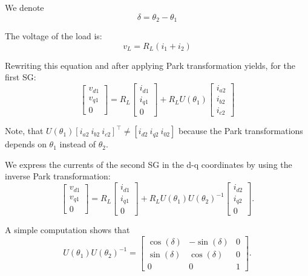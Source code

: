 \documentclass[conference]{IEEEtran}
\newcommand{\BE}{\begin{equation}}
\newcommand{\BEQ}[1]{\BE\label{#1}} %
\begin{document}
We denote 
$$\delta=\theta_{2}-\theta_{1}$$

The voltage of the load is:
$$v_L=R_{L}(i_{1}+i_{2})$$

Rewriting this equation and after applying Park transformation yields,
for the first SG:
$$
\left[\begin{array}{c}
v_{d1}\\
v_{q1}\\
0
\end{array}\right]=R_{L}\left[\begin{array}{c}
i_{d1}\\
i_{q1}\\
0
\end{array}\right]+R_{L}U(\theta_{1})\left[\begin{array}{c}
i_{a2}\\
i_{b2}\\
i_{c2}
\end{array}\right]
$$

Note, that $U(\theta_{1})\left[ i_{a2}\ i_{b2}\ i_{c2}\right]^\top \neq \left[ i_{d2}\ i_{q2}\ i_{02}\right]$ because the  Park transformations depends on  $\theta_1$ instead of $\theta_2$. 

We express  the currents of the second SG in the d-q coordinates by using the inverse Park transformation: 
\BEQ{eq:TICSGVolAndCurr}
 \left[\begin{array}{c}
v_{d1}\\
v_{q1}\\
0
\end{array}\right]=R_{L}\left[\begin{array}{c}
i_{d1}\\
i_{q1}\\
0
\end{array}\right]+R_{L}U(\theta_{1})U(\theta_{2})^{-1}\left[\begin{array}{c}
i_{d2}\\
i_{q2}\\
0
\end{array}\right].
\end{equation}

A simple computation shows that 
\BEQ{eq:ParkChangeAngle}
  U(\theta_{1})U(\theta_{2})^{-1}=\left[\begin{array}{ccc}
\cos(\delta) & -\sin(\delta) & 0\\
\sin(\delta) & \cos(\delta) & 0\\
0 & 0 & 1
\end{array}\right].
\end{equation}
\end{document}
